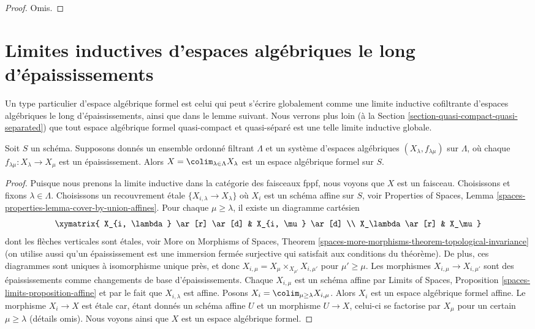 \begin{proof}
Omis.
\end{proof}






\section{Limites inductives d'espaces algébriques le long d'épaississements}
\label{section-global-colimits}

\noindent
Un type particulier d'espace algébrique formel est celui qui peut s'écrire
globalement comme une limite inductive cofiltrante d'espaces algébriques le long
d'épaississements, ainsi que dans le lemme suivant. Nous verrons plus loin
(à la Section \ref{section-quasi-compact-quasi-separated})
que tout espace algébrique formel quasi-compact et quasi-séparé
est une telle limite inductive globale.

\begin{lemma}
\label{lemma-colimit-is-formal}
Soit $S$ un schéma. Supposons donnés un ensemble ordonné filtrant
$\Lambda$ et un système d'espaces algébriques $(X_\lambda, f_{\lambda \mu})$
sur $\Lambda$, où chaque $f_{\lambda \mu} : X_\lambda \to X_\mu$ est un
épaississement. Alors $X = \colim_{\lambda \in \Lambda} X_\lambda$
est un espace algébrique formel sur $S$.
\end{lemma}

\begin{proof}
Puisque nous prenons la limite inductive dans la catégorie des faisceaux fppf,
nous voyons que $X$ est un faisceau. Choisissons et fixons $\lambda \in \Lambda$. Choisissons un
recouvrement étale $\{X_{i, \lambda} \to X_\lambda\}$ où $X_i$ est un schéma
affine sur $S$, voir Properties of Spaces, Lemma
\ref{spaces-properties-lemma-cover-by-union-affines}.
Pour chaque $\mu \geq \lambda$, il existe un diagramme cartésien
$$
\xymatrix{
X_{i, \lambda} \ar[r] \ar[d] & X_{i, \mu} \ar[d] \\
X_\lambda \ar[r] & X_\mu
}
$$
dont les flèches verticales sont étales, voir
More on Morphisms of Spaces, Theorem
\ref{spaces-more-morphisms-theorem-topological-invariance}
(on utilise aussi qu'un épaississement est une immersion fermée surjective qui
satisfait aux conditions du théorème). De plus, ces diagrammes sont
uniques à isomorphisme unique près, et donc
$X_{i, \mu} = X_\mu \times_{X_{\mu'}} X_{i, \mu'}$ pour
$\mu' \geq \mu$. Les morphismes $X_{i, \mu} \to X_{i, \mu'}$
sont des épaississements comme changements de base d'épaississements. Chaque $X_{i, \mu}$
est un schéma affine par Limits of Spaces, Proposition
\ref{spaces-limits-proposition-affine} et par le fait que
$X_{i, \lambda}$ est affine.
Posons $X_i = \colim_{\mu \geq \lambda} X_{i, \mu}$. Alors $X_i$ est
un espace algébrique formel affine. Le morphisme $X_i \to X$
est étale car, étant donnés un schéma affine $U$ et un morphisme $U \to X$,
celui-ci se factorise par $X_\mu$ pour un certain $\mu \geq \lambda$ (détails omis).
Nous voyons ainsi que $X$ est un espace algébrique formel.
\end{proof}

